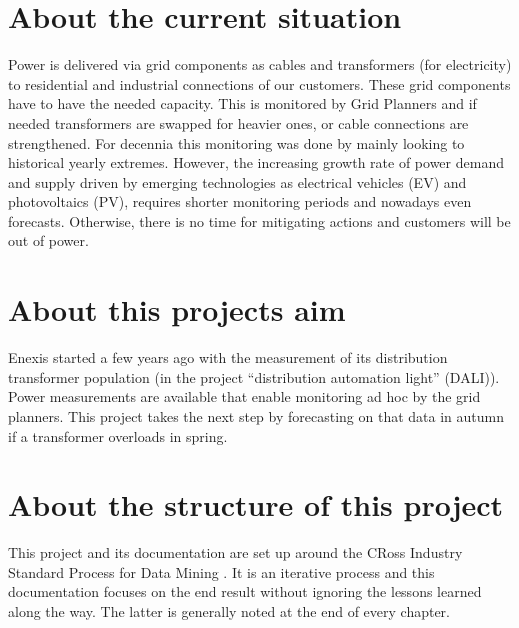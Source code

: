 \documentclass[letterpaper,10pt,english]{sphinxmanual}
\let\sphinxpxdimen\pdfpxdimen\else\newdimen\sphinxpxdimen
\begin{document}
\section{About the current situation}
\label{\detokenize{general:about-the-current-situation}}
Power is delivered via grid components as cables and transformers (for electricity) to residential and industrial connections of our customers. These grid components have to have the needed capacity. This is monitored by Grid Planners and if needed transformers are swapped for heavier ones, or cable connections are strengthened.
For decennia this monitoring was done by mainly looking to historical yearly extremes. However, the increasing growth rate of power demand and supply driven by emerging technologies as electrical vehicles (EV) and photovoltaics (PV), requires shorter monitoring periods and nowadays even forecasts. Otherwise, there is no time for mitigating actions and customers will be out of power.


\section{About this projects aim}
\label{\detokenize{general:about-this-projects-aim}}
Enexis started a few years ago with the measurement of its distribution transformer population (in the project “distribution automation light” (DALI)). Power measurements are available that enable monitoring ad hoc by the grid planners.
This project takes the next step by forecasting on that data in autumn if a transformer overloads in spring.

\noindent{\hspace*{\fill}\sphinxincludegraphics[width=400\sphinxpxdimen]{{autumn_spring_load}.png}\hspace*{\fill}}


\section{About the structure of this project}
\label{\detokenize{general:about-the-structure-of-this-project}}
This project and its documentation are set up around the CRoss Industry Standard Process for Data Mining .
It is an iterative process and this documentation focuses on the end result without ignoring the lessons learned along the way. The latter is generally noted at the end of every chapter.

\noindent{\hspace*{\fill}\sphinxincludegraphics[width=800\sphinxpxdimen]{{crisp_dm}.png}\hspace*{\fill}}
\end{document}
